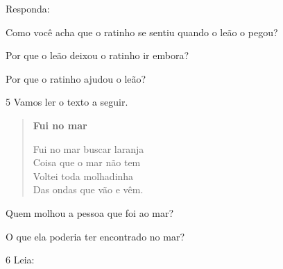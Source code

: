 Responda:

\begin{escolha}
\item Como você acha que o ratinho se sentiu quando o leão o pegou?\\

\item Por que o leão deixou o ratinho ir embora?\\

\item Por que o ratinho ajudou o leão?\\
\end{escolha}

\num{5} Vamos ler o texto a seguir.

\begin{myquote}
\begin{verse}
\textbf{Fui no mar}

Fui no mar buscar laranja\\
Coisa que o mar não tem\\
Voltei toda molhadinha\\
Das ondas que vão e vêm.
\end{verse}

\end{myquote}

\begin{escolha}
\item Quem molhou a pessoa que foi ao mar?\\

\item O que ela poderia ter encontrado no mar?\\
\end{escolha}

\num{6} Leia:


